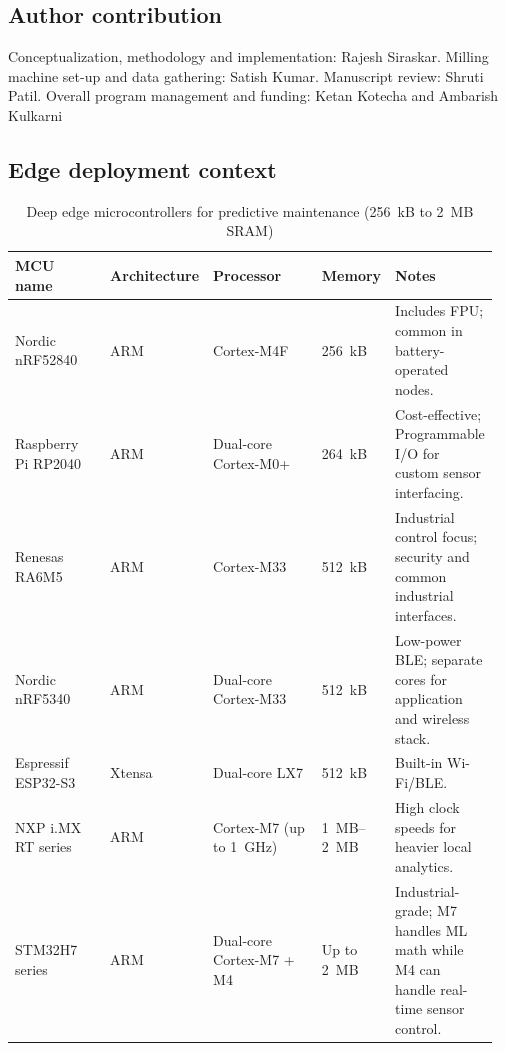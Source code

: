 \documentclass[sn-basic]{sn-jnl} %
\renewcommand{\arraystretch}{1.44}
\begin{document}
\subsection*{Author contribution}
Conceptualization, methodology and implementation: Rajesh Siraskar. Milling machine set-up and data gathering: Satish Kumar. Manuscript review: Shruti Patil. Overall program management and funding: Ketan Kotecha and Ambarish Kulkarni

\begin{appendices}

\section{Edge deployment context}\label{app:edge_context}

\begin{table}[htbp]
	\centering
	\caption{Deep edge microcontrollers for predictive maintenance (256~kB to 2~MB SRAM)}
	\label{tab:deep_edge_mcus}
	\renewcommand{\arraystretch}{1.56}
	\begin{tabular}{@{} L{0.22\linewidth} L{0.14\linewidth} L{0.26\linewidth} L{0.14\linewidth} L{0.20\linewidth} @{}}
		\toprule
		\textbf{MCU name} & \textbf{Architecture} & \textbf{Processor} & \textbf{Memory} & \textbf{Notes} \\
		\midrule
		Nordic nRF52840 & ARM & Cortex-M4F & 256~kB & Includes FPU; common in battery-operated nodes. \\		
		Raspberry Pi RP2040 & ARM & Dual-core Cortex-M0+ & 264~kB & Cost-effective; Programmable I/O for custom sensor interfacing. \\
		Renesas RA6M5 & ARM & Cortex-M33 & 512~kB & Industrial control focus; security and common industrial interfaces. \\
		Nordic nRF5340 & ARM & Dual-core Cortex-M33 & 512~kB & Low-power BLE; separate cores for application and wireless stack. \\
		Espressif ESP32-S3 & Xtensa & Dual-core LX7 & 512~kB & Built-in Wi-Fi/BLE.\\
		NXP i.MX RT series & ARM & Cortex-M7 (up to 1~GHz) & 1~MB--2~MB & High clock speeds for heavier local analytics. \\
		STM32H7 series & ARM & Dual-core Cortex-M7 + M4 & Up to 2~MB & Industrial-grade; M7 handles ML math while M4 can handle real-time sensor control. \\
		\bottomrule
	\end{tabular}
\end{table}


\end{appendices}
\end{document}
